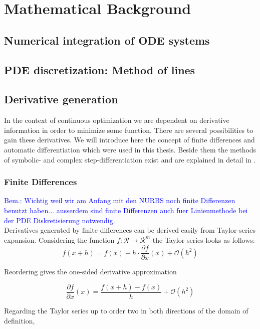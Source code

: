\documentclass{scrartcl}[12pt, halfparskip]
\newcommand{\bem}[1]{\textcolor{blue}{Bem.: #1}}
\begin{document}
\newpage
\section{Mathematical Background}
\subsection{Numerical integration of ODE systems}
\subsection{PDE discretization: Method of lines}

\subsection{Derivative generation}
In the context of continuous optimization we are dependent on derivative information in order to minimize some function. There are several possibilities to gain these derivatives. We will introduce here the concept of finite differences and automatic differentiation which were used in this thesis. Beside them the methods of symbolic- and complex step-differentiation exist and are explained in detail in \cite{diss_jan}.
\subsubsection{Finite Differences}
\bem{Wichtig weil wir am Anfang mit den NURBS noch finite Differenzen benutzt haben... ausserdem sind finite Differenzen auch fuer Linienmethode bei der PDE Diskretisierung notwendig.}\\

Derivatives generated by finite differences can be derived easily from Taylor-series expansion. Considering the function $f: \mathcal{R} \rightarrow \mathcal{R}^m$ the Taylor series looks as follows:
\begin{equation}
	f(x+h) = f(x) + h \cdot \frac{\partial f}{\partial x}(x) + \mathcal{O}(h^2)
\end{equation}

Reordering gives the one-sided derivative approximation

\begin{equation}
	\frac{\partial f}{\partial x}(x) = \frac{f(x+h) - f(x)}{h} + \mathcal{O}(h^2)
\end{equation}

Regarding the Taylor series up to order two in both directions of the domain of definition,
\end{document}
